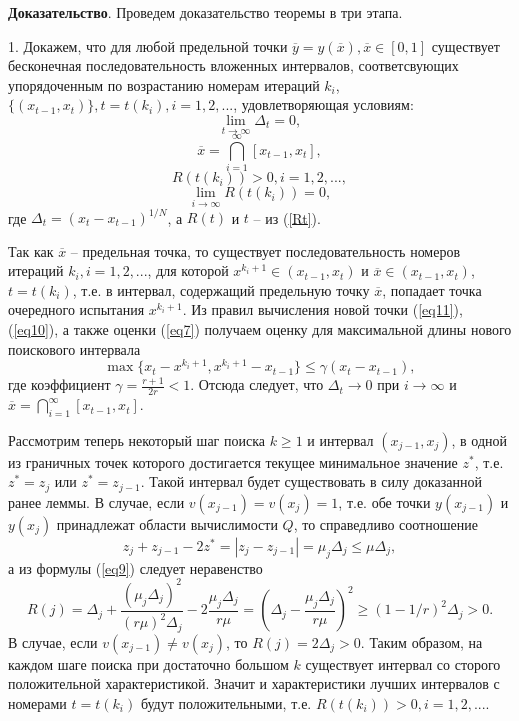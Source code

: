 \documentclass[10pt,a4paper]{book}
\begin{document}
\textbf{Доказательство}. Проведем доказательство теоремы в три этапа. 

1. Докажем, что для любой предельной точки $\overline{y}=y(\overline{x}), \overline{x} \in [0,1]$ существует бесконечная последовательность вложенных интервалов, соответсвующих упорядоченным по возрастанию номерам итераций $k_i$, $\{(x_{t-1}, x_t)\}, t = t(k_i), i = 1, 2, ...$, удовлетворяющая условиям:
\[
\lim_{t \to \infty}{\Delta_t} = 0,
\]
\[
\overline{x}=\bigcap_{i = 1}^{\infty}{[x_{t-1}, x_t]},
\]
\[
R(t(k_i))>0, i = 1, 2, ... ,
\]
\[
\lim_{i \to \infty}{R(t(k_i))} = 0,
\]
где $\Delta_t = (x_t - x_{t-1})^{1/N}$, а $R(t)$ и $t$ -- из (\ref{Rt}).

Так как $\overline{x}$ -- предельная точка, то существует последовательность номеров итераций ${k_i}, i = 1, 2, ... $, для которой $x^{k_i+1} \in (x_{t-1}, x_{t})$ и $\overline{x} \in (x_{t-1}, x_{t})$, $t = t(k_i)$, т.е. в интервал, содержащий предельную точку $\overline{x}$, попадает точка очередного испытания $x^{k_{i}+1}$. Из правил вычисления новой точки (\ref{eq11}), (\ref{eq10}), а также оценки (\ref{eq7}) получаем
оценку для максимальной длины нового поискового интервала
\[
\max\{x_t-x^{k_i+1},x^{k_i+1} - x_{t-1}\} \leq \gamma(x_t - x_{t - 1}),
\]
где коэффициент $\gamma = \frac{r+1}{2r} < 1$. Отсюда следует, что $\Delta_t \to 0$ при $i \to \infty$ и $\overline{x}=\bigcap_{i = 1}^{\infty}{[x_{t-1}, x_t]}$.

Рассмотрим теперь некоторый шаг поиска $k \geq 1$ и интервал $(x_{j-1}, x_{j})$, в одной из граничных точек которого достигается текущее минимальное значение $z^*$, т.е. $z^* = z_j$ или $z^* = z_{j-1}$. Такой интервал будет существовать в силу доказанной ранее леммы. В случае, если $v(x_{j-1}) = v(x_j) = 1$, т.е. обе точки $y(x_{j-1})$ и $y(x_{j})$ принадлежат области вычислимости $Q$, то справедливо соотношение 
\[
z_j + z_{j-1}-2z^* = |z_j-z_{j-1}| = \mu_j \Delta_j \leq \mu \Delta_j, 
\]
а из формулы (\ref{eq9}) следует неравенство
\begin{equation}\label{Rlower} 
R(j) = \Delta_j + \frac{(\mu_j \Delta_j)^2}{(r\mu)^2 \Delta_j}-2\frac{\mu_j \Delta_j}{r\mu} = (\Delta_j-\frac{\mu_j\Delta_j}{r\mu})^2 \geq (1-1/r)^2 \Delta_j > 0.
\end{equation}
В случае, если $v(x_{j-1}) \neq v(x_j)$, то $R(j)=2\Delta_j>0$. 
Таким образом, на каждом шаге поиска при достаточно большом $k$ существует интервал со сторого положительной характеристикой. Значит и характеристики лучших интервалов с номерами $t = t(k_i)$ будут положительными, т.е. $R(t(k_i))>0, i = 1, 2, ... $.
\end{document}
